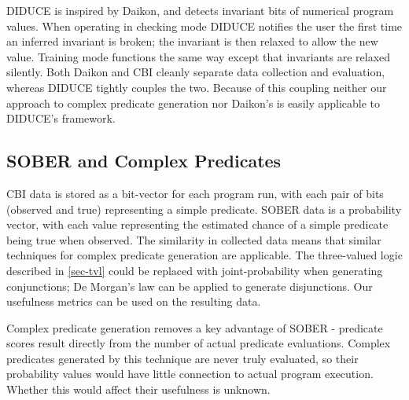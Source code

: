 DIDUCE \cite{581377} is inspired by Daikon, and detects invariant bits of numerical program values.  When operating in checking mode DIDUCE notifies the user the first time an inferred invariant is broken; the invariant is then relaxed to allow the new value.  Training mode functions the same way except that invariants are relaxed silently.  Both Daikon and CBI cleanly separate data collection and evaluation, whereas DIDUCE tightly couples the two.  Because of this coupling neither our approach to complex predicate generation nor Daikon's is easily applicable to DIDUCE's framework.

\subsection{SOBER and Complex Predicates}
CBI data is stored as a bit-vector for each program run, with each pair of bits (observed and true) representing a simple predicate.  SOBER data is a probability vector, with each value representing the estimated chance of a simple predicate being true when observed.  The similarity in collected data means that similar techniques for complex predicate generation are applicable.  The three-valued logic described in \autoref{sec-tvl} could be replaced with joint-probability when generating conjunctions; De Morgan's law can be applied to generate disjunctions.  Our usefulness metrics can be used on the resulting data.

Complex predicate generation removes a key advantage of SOBER - predicate scores result directly from the number of actual predicate evaluations.  Complex predicates generated by this technique are never truly evaluated, so their probability values would have little connection to actual program execution.  Whether this would affect their usefulness is unknown.
